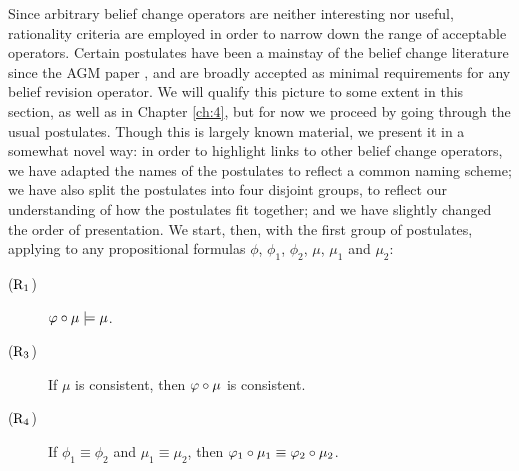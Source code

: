 Since arbitrary belief change operators are neither interesting nor useful,
rationality criteria are employed in order to narrow down the range of acceptable operators.
Certain postulates have been a mainstay of the belief change literature since the AGM paper 
\cite{AlchourronGM85},
and are broadly accepted as minimal requirements for any belief revision operator.
We will qualify this picture to some extent in this section, as well as in Chapter \ref{ch:4},
but for now we proceed by going through the usual postulates.
Though this is largely known material, we present it in a somewhat novel way:
in order to highlight links to other belief change operators, 
we have adapted the names of the postulates to reflect a common naming scheme;
we have also split the postulates into four disjoint groups, 
to reflect our understanding of how the postulates fit together;
and we have slightly changed the order of presentation.
We start, then, with the first group of postulates,
applying to any propositional formulas $\phi$, $\phi_1$, $\phi_2$, 
$\mu$, $\mu_1$ and $\mu_2$:

\begin{description}
	\item[($\mathrm{R}_{1}$)] $\varphi\circ\mu\models\mu$.
	\item[($\mathrm{R}_{3}$)] If $\mu$ is consistent, then $\varphi\circ\mu$ is consistent.
	\item[($\mathrm{R}_{4}$)] If $\phi_1\equiv\phi_2$ and $\mu_1\equiv\mu_2$, then $\varphi_1\circ\mu_1\equiv\varphi_2\circ\mu_2$.
\end{description}


